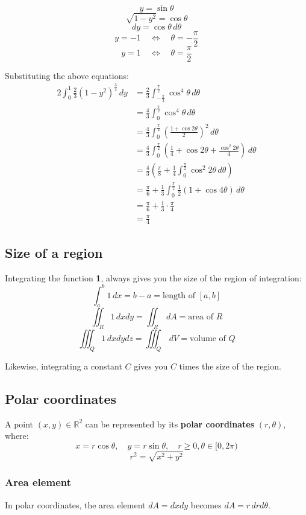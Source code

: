 \documentclass[11pt]{article}
\begin{document}
\[y = \sin \theta\]
\[\sqrt{1 - y^2} = \cos \theta\]
\[dy = \cos \theta \, d \theta\]
\[y = -1 \quad \Leftrightarrow \quad \theta = - \frac{\pi}{2}\]
\[y = 1 \quad \Leftrightarrow \quad \theta = \frac{\pi}{2}\]

Substituting the above equations:
\begin{align*}
2 \int_0^1 \frac{2}{3} (1 - y^2)^{\frac{3}{2}} \, dy &= \frac{2}{3} \int_{-\frac{\pi}{2}}^{\frac{\pi}{2}} \cos^4 \theta \, d \theta \\
&= \frac{4}{3} \int_{0}^{\frac{\pi}{2}} \cos^4 \theta \, d \theta \\
&= \frac{4}{3} \int_{0}^{\frac{\pi}{2}} \left(\frac{1 + \cos 2 \theta}{2} \right)^2 \, d \theta \\
&= \frac{4}{3} \int_{0}^{\frac{\pi}{2}} \left(\frac{1}{4} + \cos 2 \theta + \frac{\cos^2 2 \theta}{4} \right) \, d \theta \\
&= \frac{4}{3} \left(\frac{\pi}{8} + \frac{1}{4} \int_0^{\frac{\pi}{2}} \cos^2 2 \theta \, d \theta \right) \\
&= \frac{\pi}{6} + \frac{1}{3} \int_0^{\frac{\pi}{2}} \frac{1}{2} (1 + \cos 4 \theta) \, d \theta \\
&= \frac{\pi}{6} + \frac{1}{3} \cdot \frac{\pi}{4} \\
&= \frac{\pi}{4}
\end{align*}
\subsection{Size of a region}
\label{sec:org9cc4b3e}
Integrating the function \textbf{1}, always gives you the size of the region of integration:
\[\int_a^b 1 \, dx = b - a = \text{length of } [a, b]\]
\[\iint_R 1 \, dx dy = \iint_R \, dA = \text{area of } R\]
\[\iiint_Q 1 \, dx dy dz = \iiint_Q \, dV = \text{volume of } Q\]

Likewise, integrating a constant \(C\) gives you \(C\) times the size of the region.

\newpage
\subsection{Polar coordinates}
\label{sec:orga9c1019}
A point \((x, y) \in \mathbb{R}^2\) can be represented by its \textbf{polar coordinates} \((r, \theta)\), where:
\[x = r \cos \theta, \quad y = r \sin \theta, \quad r \ge 0, \theta \in [0, 2 \pi)\]
\[r^2 = \sqrt{x^2 + y^2}\]
\subsubsection{Area element}
\label{sec:org1d37f11}
In polar coordinates, the area element \(dA = dx dy\) becomes \(dA = r \, dr d \theta\).
\end{document}
